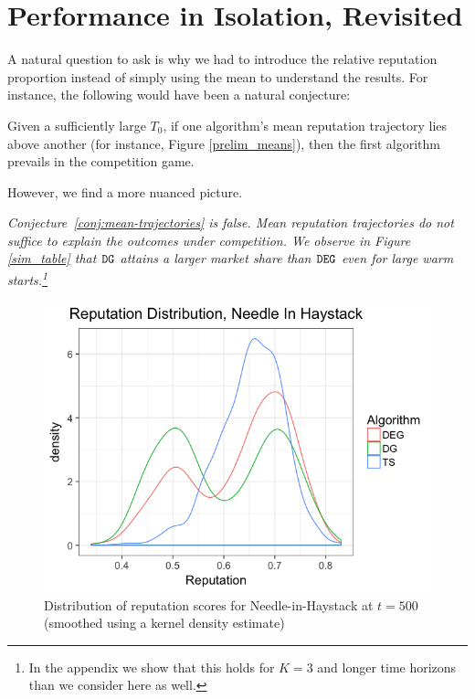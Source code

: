 \documentclass[../competing_bandits.tex]{subfiles}
\begin{document}
\section{Performance in Isolation, Revisited}\label{section:revisited}

A natural question to ask is why we had to introduce the relative reputation proportion instead of simply using the mean to understand the results. For instance, the following would have been a natural conjecture:
\begin{conjecture}\label{conj:mean-trajectories}
Given a sufficiently large $T_0$, if one algorithm's mean reputation trajectory lies above another (for instance, Figure  \ref{prelim_means}), then the first algorithm prevails in the competition game.
\end{conjecture}

However, we find a more nuanced picture.

\begin{finding}
\textit{
Conjecture~\ref{conj:mean-trajectories} is false. Mean reputation trajectories do not suffice to explain the outcomes under competition. We observe in Figure \ref{sim_table} that $\mathtt{DG}$ attains a larger market share than $\mathtt{DEG}$ even for large warm starts.\footnote{In the appendix we show that this holds for $K = 3$ and longer time horizons than we consider here as well.}}
\end{finding}

\begin{figure}[ht]
\includegraphics[scale=0.35]{figures/rep_distribution_nih}
\caption{Distribution of reputation scores for Needle-in-Haystack at $t=500$ (smoothed using a kernel density estimate)}
\label{rep_dist_nih}
\end{figure}
\end{document}
